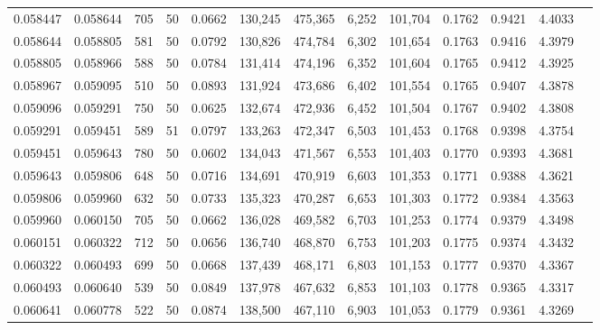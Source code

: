 \begin{tabular}{rrrrrrrrrrrrr}
0.058447 & 0.058644 &   705 &  50 &                                     0.0662 & 130,245 & 475,365 &   6,252 & 101,704 & 0.1762 & 0.9421 & 4.4033 \\
0.058644 & 0.058805 &   581 &  50 &                                     0.0792 & 130,826 & 474,784 &   6,302 & 101,654 & 0.1763 & 0.9416 & 4.3979 \\
0.058805 & 0.058966 &   588 &  50 &                                     0.0784 & 131,414 & 474,196 &   6,352 & 101,604 & 0.1765 & 0.9412 & 4.3925 \\
0.058967 & 0.059095 &   510 &  50 &                                     0.0893 & 131,924 & 473,686 &   6,402 & 101,554 & 0.1765 & 0.9407 & 4.3878 \\
0.059096 & 0.059291 &   750 &  50 &                                     0.0625 & 132,674 & 472,936 &   6,452 & 101,504 & 0.1767 & 0.9402 & 4.3808 \\
0.059291 & 0.059451 &   589 &  51 &                                     0.0797 & 133,263 & 472,347 &   6,503 & 101,453 & 0.1768 & 0.9398 & 4.3754 \\
0.059451 & 0.059643 &   780 &  50 &                                     0.0602 & 134,043 & 471,567 &   6,553 & 101,403 & 0.1770 & 0.9393 & 4.3681 \\
0.059643 & 0.059806 &   648 &  50 &                                     0.0716 & 134,691 & 470,919 &   6,603 & 101,353 & 0.1771 & 0.9388 & 4.3621 \\
0.059806 & 0.059960 &   632 &  50 &                                     0.0733 & 135,323 & 470,287 &   6,653 & 101,303 & 0.1772 & 0.9384 & 4.3563 \\
0.059960 & 0.060150 &   705 &  50 &                                     0.0662 & 136,028 & 469,582 &   6,703 & 101,253 & 0.1774 & 0.9379 & 4.3498 \\
0.060151 & 0.060322 &   712 &  50 &                                     0.0656 & 136,740 & 468,870 &   6,753 & 101,203 & 0.1775 & 0.9374 & 4.3432 \\
0.060322 & 0.060493 &   699 &  50 &                                     0.0668 & 137,439 & 468,171 &   6,803 & 101,153 & 0.1777 & 0.9370 & 4.3367 \\
0.060493 & 0.060640 &   539 &  50 &                                     0.0849 & 137,978 & 467,632 &   6,853 & 101,103 & 0.1778 & 0.9365 & 4.3317 \\
0.060641 & 0.060778 &   522 &  50 &                                     0.0874 & 138,500 & 467,110 &   6,903 & 101,053 & 0.1779 & 0.9361 & 4.3269 \\

\end{tabular}
